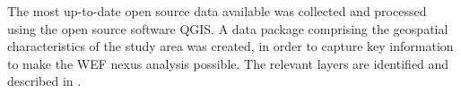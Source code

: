 
The most up-to-date open source data available was collected and processed using the open source software QGIS. A data package comprising the geospatial characteristics of the study area was created, in order to capture key information to make the WEF nexus analysis possible. The relevant layers are identified and described in .


